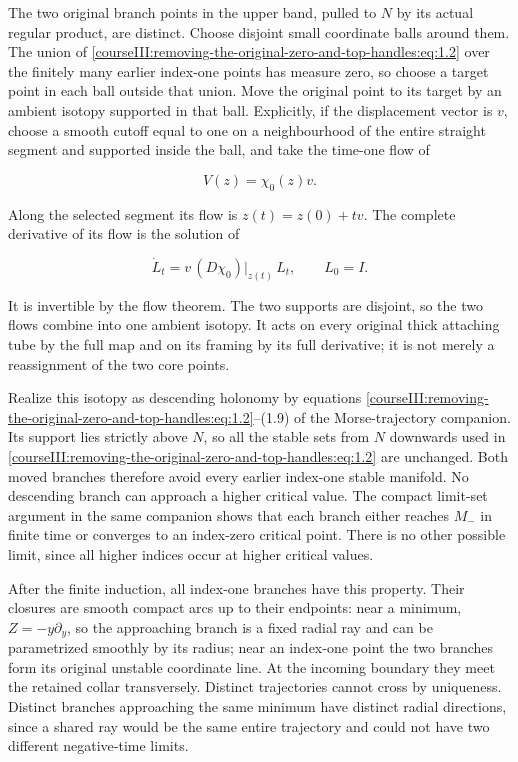 The two original branch points in the upper band, pulled to \(N\) by its actual regular product, are distinct. Choose disjoint small coordinate balls around them. The union of \eqref{courseIII:removing-the-original-zero-and-top-handles:eq:1.2} over the finitely many earlier index-one points has measure zero, so choose a target point in each ball outside that union. Move the original point to its target by an ambient isotopy supported in that ball. Explicitly, if the displacement vector is \(v\), choose a smooth cutoff equal to one on a neighbourhood of the entire straight segment and supported inside the ball, and take the time-one flow of

\begin{equation}
V(z)=\chi_0(z)v.
 \label{courseIII:removing-the-original-zero-and-top-handles:eq:1.3}
\end{equation}

Along the selected segment its flow is \(z(t)=z(0)+tv\). The complete derivative of its flow is the solution of

\begin{equation}
\dot L_t=
 v\,(D\chi_0)|_{z(t)}\,L_t,\qquad L_0=I.
 \label{courseIII:removing-the-original-zero-and-top-handles:eq:1.4}
\end{equation}

It is invertible by the flow theorem. The two supports are disjoint, so the two flows combine into one ambient isotopy. It acts on every original thick attaching tube by the full map and on its framing by its full derivative; it is not merely a reassignment of the two core points.

Realize this isotopy as descending holonomy by equations \eqref{courseIII:removing-the-original-zero-and-top-handles:eq:1.2}--(1.9) of the Morse-trajectory companion. Its support lies strictly above \(N\), so all the stable sets from \(N\) downwards used in \eqref{courseIII:removing-the-original-zero-and-top-handles:eq:1.2} are unchanged. Both moved branches therefore avoid every earlier index-one stable manifold. No descending branch can approach a higher critical value. The compact limit-set argument in the same companion shows that each branch either reaches \(M_-\) in finite time or converges to an index-zero critical point. There is no other possible limit, since all higher indices occur at higher critical values.

After the finite induction, all index-one branches have this property. Their closures are smooth compact arcs up to their endpoints: near a minimum, \(Z=-y\partial_y\), so the approaching branch is a fixed radial ray and can be parametrized smoothly by its radius; near an index-one point the two branches form its original unstable coordinate line. At the incoming boundary they meet the retained collar transversely. Distinct trajectories cannot cross by uniqueness. Distinct branches approaching the same minimum have distinct radial directions, since a shared ray would be the same entire trajectory and could not have two different negative-time limits.

